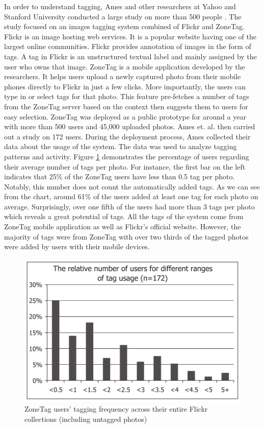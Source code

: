 In order to understand tagging, Ames and other researchers at Yahoo and Stanford University conducted a large study on more than 500 people \cite{ames2007we}. The study focused on an images tagging system combined of Flickr and ZoneTag. Flickr is an image hosting web services. It is a popular website having one of the largest online communities. Flickr provides annotation of images in the form of tags. A tag in Flickr is an unstructured textual label and mainly assigned by the user who owns that image. ZoneTag is a mobile application developed by the researchers. It helps users upload a newly captured photo from their mobile phones directly to Flickr in just a few clicks. More importantly, the users can type in or select tags for that photo. This feature pre-fetches a number of tags from the ZoneTag server based on the context then suggests them to users for easy selection. ZoneTag was deployed as a public prototype for around a year with more than 500 users and 45,000 uploaded photos. Ames et. al. then carried out a study on 172 users. During the deployment process, Ames collected their data about the usage of the system. The data was used to analyze tagging patterns and activity. Figure \ref{fig:zonetag} demonstrates the percentage of users regarding their average number of tags per photo. For instance, the first bar on the left indicates that 25\% of the ZoneTag users have less than 0.5 tag per photo. Notably, this number does not count the automatically added tags. As we can see from the chart, around 61\% of the users added at least one tag for each photo on average. Surprisingly, over one fifth of the users had more than 3 tags per photo which reveals a great potential of tags. All the tags of the system come from ZoneTag mobile application as well as Flickr's official website. However, the majority of tags were from ZoneTag with over two thirds of the tagged photos were added by users with their mobile devices.

\begin{figure}[!h]
\begin{centering}
\includegraphics[scale=0.7]{pics/zonetag.png}
\caption{ZoneTag users' tagging frequency across their entire Flickr collections (including untagged photos)}\label{fig:zonetag}
\end{centering}
\end{figure}

